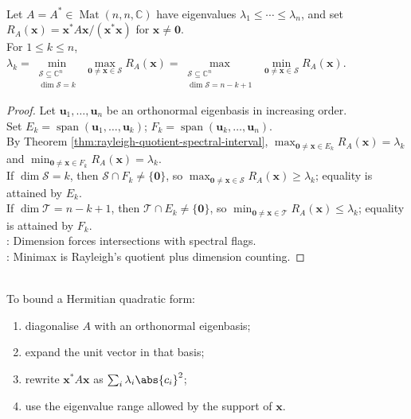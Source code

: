 \begin{theorem} \label{thm:courant-fischer-rayleigh-minmax} \\
Let $A=A^*\in\operatorname{Mat}(n,n,\mathbb{C})$ have eigenvalues $\lambda_1\leq\cdots\leq\lambda_n$, and set $R_A(\mathbf{x})=\mathbf{x}^*A\mathbf{x}/(\mathbf{x}^*\mathbf{x})$ for $\mathbf{x}\neq\mathbf{0}$.\\
For $1\leq k\leq n$, $\lambda_k =\min\limits_{\substack{\mathcal{S}\subseteq\mathbb{C}^n\\ \dim\mathcal{S}=k}}\; \max\limits_{\mathbf{0}\neq\mathbf{x}\in\mathcal{S}} R_A(\mathbf{x}) =\max\limits_{\substack{\mathcal{S}\subseteq\mathbb{C}^n\\ \dim\mathcal{S}=n-k+1}}\; \min\limits_{\mathbf{0}\neq\mathbf{x}\in\mathcal{S}} R_A(\mathbf{x})$.
\begin{proof}
Let $\mathbf{u}_1,\ldots,\mathbf{u}_n$ be an orthonormal eigenbasis in increasing order.\\
Set $E_k=\operatorname{span}(\mathbf{u}_1,\ldots,\mathbf{u}_k)$; $F_k=\operatorname{span}(\mathbf{u}_k,\ldots,\mathbf{u}_n)$.\\
By Theorem \ref{thm:rayleigh-quotient-spectral-interval}, $\max_{\mathbf{0}\neq\mathbf{x}\in E_k}R_A(\mathbf{x})=\lambda_k$ and $\min_{\mathbf{0}\neq\mathbf{x}\in F_k}R_A(\mathbf{x})=\lambda_k$.\\
If $\dim\mathcal{S}=k$, then $\mathcal{S}\cap F_k\neq\{\mathbf{0}\}$, so $\max_{\mathbf{0}\neq\mathbf{x}\in\mathcal{S}}R_A(\mathbf{x})\geq\lambda_k$; equality is attained by $E_k$.\\
If $\dim\mathcal{T}=n-k+1$, then $\mathcal{T}\cap E_k\neq\{\mathbf{0}\}$, so $\min_{\mathbf{0}\neq\mathbf{x}\in\mathcal{T}}R_A(\mathbf{x})\leq\lambda_k$; equality is attained by $F_k$.\\
: Dimension forces intersections with spectral flags.\\
: Minimax is Rayleigh's quotient plus dimension counting.
\end{proof}
\end{theorem}

\begin{method} \label{meth:rayleigh-eigenbasis-method} \\
To bound a Hermitian quadratic form:
\begin{enumerate}[label=(\roman*)]
\setlength{\itemsep}{0pt}
\item diagonalise $A$ with an orthonormal eigenbasis;
\item expand the unit vector in that basis;
\item rewrite $\mathbf{x}^*A\mathbf{x}$ as $\sum_i\lambda_i\abs{c_i}^2$;
\item use the eigenvalue range allowed by the support of $\mathbf{x}$.
\end{enumerate}
\end{method}

